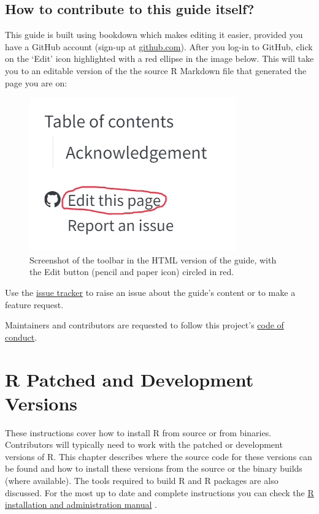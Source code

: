 \documentclass[
]{book}
\begin{document}
\section{How to contribute to this guide itself?}\label{how-to-contribute-to-this-guide}

This guide is built using bookdown which makes editing it easier, provided you have a GitHub account (sign-up at \href{https://github.com/}{github.com}). After you log-in to GitHub, click on the `Edit' icon highlighted with a red ellipse in the image below. This will take you to an editable version of the the source R Markdown file that generated the page you are on:

\begin{figure}
\centering
\includegraphics{img/edit_icon.png}
\caption{Screenshot of the toolbar in the HTML version of the guide, with the Edit button (pencil and paper icon) circled in red.}
\end{figure}

Use the \href{https://github.com/r-devel/rdevguide/issues}{issue tracker} to raise an issue about the guide's content or to make a feature request.

Maintainers and contributors are requested to follow this project's \href{https://github.com/r-devel/rdevguide/blob/main/CONDUCT.md}{code of conduct}.

\chapter{R Patched and Development Versions}\label{GetStart}

These instructions cover how to install R from source or from binaries.
Contributors will typically need to work with the patched or development versions of R.
This chapter describes where the source code for these versions can be found and how to install these versions from the source or the binary builds (where available).
The tools required to build R and R packages are also discussed.
For the most up to date and complete instructions you can check the \href{https://cran.r-project.org/doc/manuals/r-devel/R-admin.html}{R installation and administration manual} .
\end{document}
